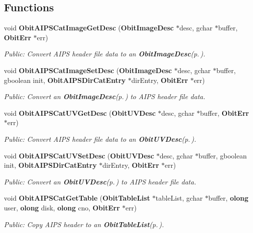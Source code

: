 \subsection*{Functions}
\begin{CompactItemize}
\item 
void {\bf Obit\-AIPSCat\-Image\-Get\-Desc} ({\bf Obit\-Image\-Desc} $\ast$desc, gchar $\ast$buffer, {\bf Obit\-Err} $\ast$err)
\begin{CompactList}\small\item\em Public: Convert AIPS header file data to an {\bf Obit\-Image\-Desc}{\rm (p.\,\pageref{structObitImageDesc})}. \item\end{CompactList}\item 
void {\bf Obit\-AIPSCat\-Image\-Set\-Desc} ({\bf Obit\-Image\-Desc} $\ast$desc, gchar $\ast$buffer, gboolean init, {\bf Obit\-AIPSDir\-Cat\-Entry} $\ast$dir\-Entry, {\bf Obit\-Err} $\ast$err)
\begin{CompactList}\small\item\em Public: Convert an {\bf Obit\-Image\-Desc}{\rm (p.\,\pageref{structObitImageDesc})} to AIPS header file data. \item\end{CompactList}\item 
void {\bf Obit\-AIPSCat\-UVGet\-Desc} ({\bf Obit\-UVDesc} $\ast$desc, gchar $\ast$buffer, {\bf Obit\-Err} $\ast$err)
\begin{CompactList}\small\item\em Public: Convert AIPS header file data to an {\bf Obit\-UVDesc}{\rm (p.\,\pageref{structObitUVDesc})}. \item\end{CompactList}\item 
void {\bf Obit\-AIPSCat\-UVSet\-Desc} ({\bf Obit\-UVDesc} $\ast$desc, gchar $\ast$buffer, gboolean init, {\bf Obit\-AIPSDir\-Cat\-Entry} $\ast$dir\-Entry, {\bf Obit\-Err} $\ast$err)
\begin{CompactList}\small\item\em Public: Convert an {\bf Obit\-UVDesc}{\rm (p.\,\pageref{structObitUVDesc})} to AIPS header file data. \item\end{CompactList}\item 
void {\bf Obit\-AIPSCat\-Get\-Table} ({\bf Obit\-Table\-List} $\ast$table\-List, gchar $\ast$buffer, {\bf olong} user, {\bf olong} disk, {\bf olong} cno, {\bf Obit\-Err} $\ast$err)
\begin{CompactList}\small\item\em Public: Copy AIPS header to an {\bf Obit\-Table\-List}{\rm (p.\,\pageref{structObitTableList})}. \item\end{CompactList}\item 

\end{CompactItemize}
